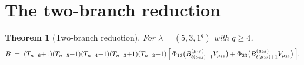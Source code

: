 \documentclass[11pt]{article}
\newtheorem{theorem}{Theorem}
\theoremstyle{definition}
\begin{document}
\section{The two-branch reduction}\label{sec:reduction}

\begin{theorem}[Two-branch reduction]\label{thm:reduction}
For $\lambda = (5, 3, 1^q)$ with $q \ge 4$,
\begin{equation}\label{eq:reduction}
   B \;=\; (T_{n-6}{+}1)(T_{n-5}{+}1)(T_{n-4}{+}1)(T_{n-3}{+}1)(T_{n-2}{+}1)\,
   \Bigl[\,\Phi_{13}\bigl(B_{\ell(\mu_{13})+1}^{(\mu_{13})} V_{\mu_{13}}\bigr)
        + \Phi_{23}\bigl(B_{\ell(\mu_{23})+1}^{(\mu_{23})} V_{\mu_{23}}\bigr)
   \,\Bigr].
\end{equation}
\end{theorem}
\end{document}
